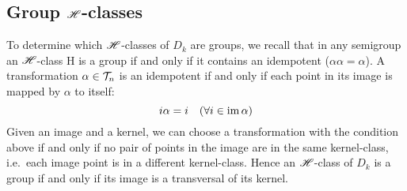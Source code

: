 \subsection{Group $\mathrel{\mathscr{H}}$-classes}
\label{sec:grouphclasses}
To determine which $\mathrel{\mathscr{H}}$-classes of $D_k$ are groups, we recall that in any
semigroup an $\mathrel{\mathscr{H}}$-class H is a group if and only if it contains an idempotent
($\alpha \alpha = \alpha$).  A transformation $\alpha \in \mathcal{T}_n$ is an idempotent
if and only if each point in its image is mapped by $\alpha$ to itself:
$$i \alpha = i \quad (\forall i \in \operatorname{im} \alpha)$$
Given an image and a kernel, we can choose a transformation with the condition
above if and only if no pair of points in the image are in the same
kernel-class, i.e.~each image point is in a different kernel-class.
Hence an $\mathrel{\mathscr{H}}$-class of $D_k$ is a group if and only if its image is a transversal
of its kernel.

